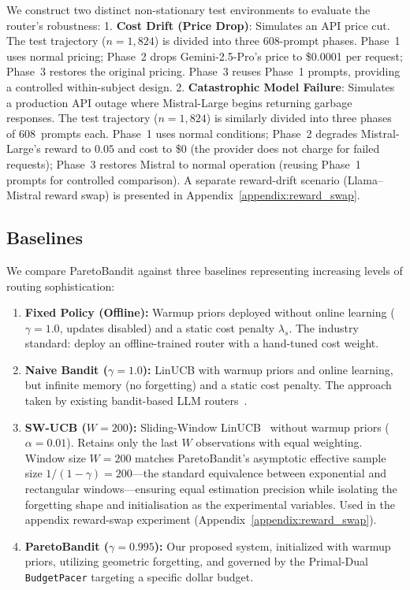 We construct two distinct non-stationary test environments to evaluate the router's robustness:
1. \textbf{Cost Drift (Price Drop)}: Simulates an API price cut. The test trajectory ($n{=}1{,}824$) is divided into three 608-prompt phases. Phase~1 uses normal pricing; Phase~2 drops Gemini-2.5-Pro's price to \$0.0001 per request; Phase~3 restores the original pricing. Phase~3 reuses Phase~1 prompts, providing a controlled within-subject design.
2. \textbf{Catastrophic Model Failure}: Simulates a production API outage where Mistral-Large begins returning garbage responses. The test trajectory ($n{=}1{,}824$) is similarly divided into three phases of 608~prompts each. Phase~1 uses normal conditions; Phase~2 degrades Mistral-Large's reward to $0.05$ and cost to \$0 (the provider does not charge for failed requests); Phase~3 restores Mistral to normal operation (reusing Phase~1 prompts for controlled comparison). A separate reward-drift scenario (Llama--Mistral reward swap) is presented in Appendix~\ref{appendix:reward_swap}.

\subsection{Baselines}

We compare ParetoBandit against three baselines representing increasing levels of routing sophistication:
\begin{enumerate}[nosep,leftmargin=*]
  \item \textbf{Fixed Policy (Offline):} Warmup priors deployed
    without online learning ($\gamma{=}1.0$, updates disabled)
    and a static cost penalty $\lambda_s$.  The industry standard:
    deploy an offline-trained router with a hand-tuned cost weight.
  \item \textbf{Naive Bandit ($\gamma{=}1.0$):} LinUCB with warmup
    priors and online learning, but infinite memory (no forgetting)
    and a static cost penalty.  The approach taken by existing
    bandit-based LLM
    routers~\cite{panda2025pilot,wang2025barp,li2025llmbandit}.
  \item \textbf{SW-UCB ($W{=}200$):} Sliding-Window
    LinUCB~\cite{garivier2011switching} without warmup priors
    ($\alpha{=}0.01$).  Retains only the last $W$ observations
    with equal weighting.  Window size $W{=}200$ matches
    ParetoBandit's asymptotic effective sample size
    $1/(1{-}\gamma){=}200$---the standard equivalence between
    exponential and rectangular windows---ensuring equal estimation
    precision while isolating the forgetting shape and initialisation
    as the experimental variables.  Used in the appendix
    reward-swap experiment (Appendix~\ref{appendix:reward_swap}).
  \item \textbf{ParetoBandit ($\gamma{=}0.995$):} Our proposed system,
    initialized with warmup priors, utilizing geometric forgetting,
    and governed by the Primal-Dual \texttt{BudgetPacer} targeting
    a specific dollar budget.
\end{enumerate}

